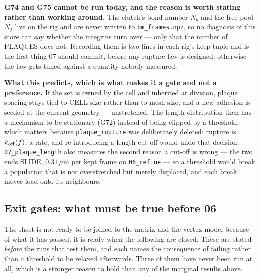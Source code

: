 \documentclass[10pt,a4paper]{article}
\newcommand{\code}[1]{\texttt{#1}}
\newcommand{\op}[1]{\texttt{#1}}
\begin{document}
\textbf{G74 and G75 cannot be run today, and the reason is worth stating rather than working around.}
The clutch's bond number $N_b$ and the free pool $N_f$ live on the rig and are never written to
\code{bm\_frames.npz}, so no diagnosis of this store can say whether the integrins turn over --- only
that the number of PLAQUES does not. Recording them is two lines in each rig's keep-tuple and is the
first thing 07 should commit, before any rupture law is designed: otherwise the law gets tuned
against a quantity nobody measured.

\textbf{What this predicts, which is what makes it a gate and not a preference.} If the set is owned
by the cell and inherited at division, plaque spacing stays tied to CELL size rather than to mesh
size, and a new adhesion is seeded at the current geometry --- unstretched. The length distribution
then has a mechanism to be stationary (G72) instead of being clipped by a threshold, which matters
because \op{plaque\_rupture} was deliberately deleted: rupture is $k_{\rm off}(f)$, a rate, and
re-introducing a length cut-off would undo that decision. \op{07\_plaque\_length} also measures the
second reason a cut-off is wrong --- the two ends SLIDE, $0.31\,\mu$m per kept frame on
\op{06\_refine} --- so a threshold would break a population that is not overstretched but merely
displaced, and each break moves load onto its neighbours.


\subsection*{Exit gates: what must be true before 06}

The sheet is not ready to be joined to the matrix and the vertex model because of what it has passed;
it is ready when the following are closed. These are stated \emph{before} the runs that test them, and
each names the consequence of failing rather than a threshold to be relaxed afterwards. Three of them
have never been run at all, which is a stronger reason to hold than any of the marginal results above.
\end{document}
